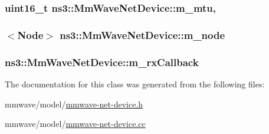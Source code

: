 \subsubsection[{\texorpdfstring{m\+\_\+mtu}{m_mtu}}]{\setlength{\rightskip}{0pt plus 5cm}uint16\+\_\+t ns3\+::\+Mm\+Wave\+Net\+Device\+::m\+\_\+mtu\hspace{0.3cm}{\ttfamily [mutable]}, {\ttfamily [private]}}\hypertarget{classns3_1_1MmWaveNetDevice_a0658be0e61a3769cb32dcdd42c262254}{}\label{classns3_1_1MmWaveNetDevice_a0658be0e61a3769cb32dcdd42c262254}
\subsubsection[{\texorpdfstring{m\+\_\+node}{m_node}}]{$<${\bf Node}$>$ ns3\+::\+Mm\+Wave\+Net\+Device\+::m\+\_\+node\hspace{0.3cm}{\ttfamily [private]}}\hypertarget{classns3_1_1MmWaveNetDevice_a877178b8aaaa6eb7f19f6ea6afa67d81}{}\label{classns3_1_1MmWaveNetDevice_a877178b8aaaa6eb7f19f6ea6afa67d81}
\subsubsection[{\texorpdfstring{m\+\_\+rx\+Callback}{m_rxCallback}}]{ ns3\+::\+Mm\+Wave\+Net\+Device\+::m\+\_\+rx\+Callback\hspace{0.3cm}{\ttfamily [protected]}}\hypertarget{classns3_1_1MmWaveNetDevice_ad4662cd1924d9c9c7f3b8f1e1a71e7cd}{}\label{classns3_1_1MmWaveNetDevice_ad4662cd1924d9c9c7f3b8f1e1a71e7cd}


The documentation for this class was generated from the following files\+:\begin{DoxyCompactItemize}
\item 
mmwave/model/\hyperlink{mmwave-net-device_8h}{mmwave-\/net-\/device.\+h}\item 
mmwave/model/\hyperlink{mmwave-net-device_8cc}{mmwave-\/net-\/device.\+cc}\end{DoxyCompactItemize}
